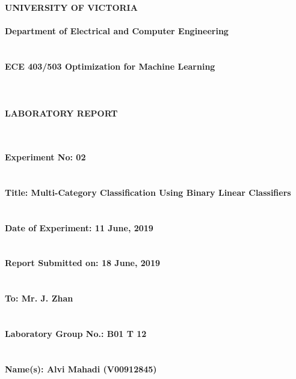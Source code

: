 \documentclass[11pt,a4paper,twoside]{article}
\begin{document}
\begin{center}
{\bf {\Huge UNIVERSITY OF VICTORIA} ~\\
	~\\
	{\huge Department of Electrical and Computer Engineering} ~\\
	~\\
	~\\
	{\huge ECE 403/503 Optimization for Machine Learning} ~\\
	~\\
	~\\
	~\\
	{\huge LABORATORY REPORT}
	~\\
	~\\
	~\\
}
\end{center}
{\bf
{\LARGE Experiment No: 02}
~\\
~\\
~\\
{\LARGE Title: Multi-Category Classification Using Binary Linear Classifiers}
~\\
~\\
~\\
{\LARGE Date of Experiment: 11 June, 2019}
~\\
~\\
~\\
{\LARGE Report Submitted on: 18 June, 2019}
~\\
~\\
~\\
{\LARGE To: Mr. J. Zhan}
~\\
~\\
~\\
{\LARGE Laboratory Group No.: B01 T 12}
~\\
~\\
~\\
{\LARGE Name(s): Alvi Mahadi (V00912845)}
~\\
~\\
~\\
}

\newpage




\end{document}
